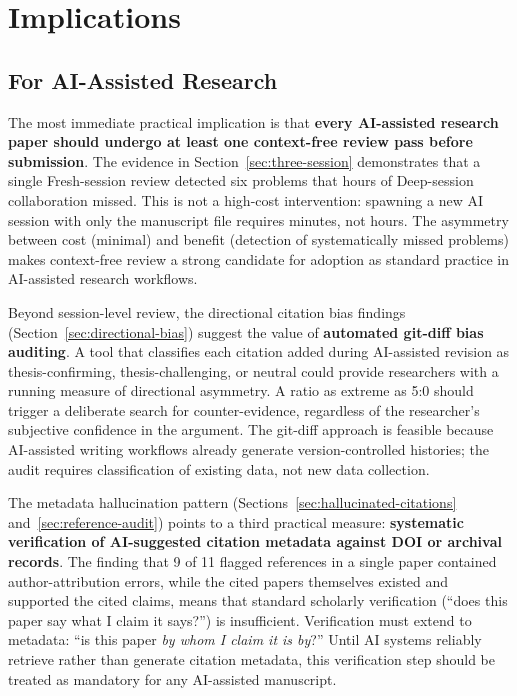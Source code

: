 \documentclass[12pt]{article}
\begin{document}
\section{Implications}
\label{sec:implications}

\subsection{For AI-Assisted Research}

The most immediate practical implication is that \textbf{every AI-assisted research paper should undergo at least one context-free review pass before submission}. The evidence in Section~\ref{sec:three-session} demonstrates that a single Fresh-session review detected six problems that hours of Deep-session collaboration missed. This is not a high-cost intervention: spawning a new AI session with only the manuscript file requires minutes, not hours. The asymmetry between cost (minimal) and benefit (detection of systematically missed problems) makes context-free review a strong candidate for adoption as standard practice in AI-assisted research workflows.

Beyond session-level review, the directional citation bias findings (Section~\ref{sec:directional-bias}) suggest the value of \textbf{automated git-diff bias auditing}. A tool that classifies each citation added during AI-assisted revision as thesis-confirming, thesis-challenging, or neutral could provide researchers with a running measure of directional asymmetry. A ratio as extreme as 5:0 should trigger a deliberate search for counter-evidence, regardless of the researcher's subjective confidence in the argument. The git-diff approach is feasible because AI-assisted writing workflows already generate version-controlled histories; the audit requires classification of existing data, not new data collection.

The metadata hallucination pattern (Sections~\ref{sec:hallucinated-citations} and~\ref{sec:reference-audit}) points to a third practical measure: \textbf{systematic verification of AI-suggested citation metadata against DOI or archival records}. The finding that 9 of 11 flagged references in a single paper contained author-attribution errors, while the cited papers themselves existed and supported the cited claims, means that standard scholarly verification (``does this paper say what I claim it says?'') is insufficient. Verification must extend to metadata: ``is this paper \emph{by whom I claim it is by}?'' Until AI systems reliably retrieve rather than generate citation metadata, this verification step should be treated as mandatory for any AI-assisted manuscript.
\end{document}
